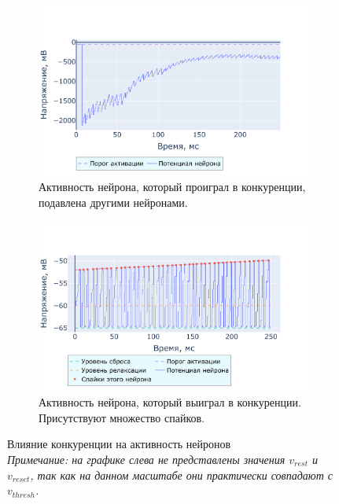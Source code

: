 \documentclass[a4paper]{article}
\begin{document}
\begin{figure}[H]
\centering
\begin{subfigure}{0.95\textwidth}
    \includegraphics[width=\textwidth,keepaspectratio=true]{bad_voltage_ru.pdf}
    \caption{Активность нейрона, который проиграл в конкуренции, подавлена другими нейронами.
    } 
\end{subfigure}
\begin{subfigure}{0.95\textwidth}
    \includegraphics[width=\textwidth,keepaspectratio=true]{good_voltage_ru.pdf}
    \caption{Активность нейрона, который выиграл в конкуренции. Присутствуют множество спайков.}
\end{subfigure}
\caption{Влияние конкуренции на активность нейронов\\
\textit{Примечание: на графике слева не представлены значения $v_{rest}$ и $v_{reset}$, так как на данном масштабе они практически совпадают с $v_{thresh}$.}}
\end{figure} 
\end{document}
